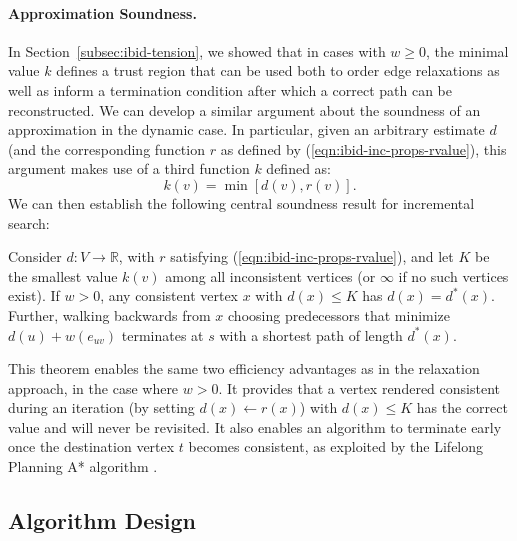\paragraph{Approximation Soundness.}
In Section~\ref{subsec:ibid-tension},
we showed that in cases with $w \geq 0$,
the minimal value $k$ defines a trust region that can be used both
to order edge relaxations as well as inform a termination condition
after which a correct path can be reconstructed.
We can develop a similar argument about the soundness of an
approximation in the dynamic case.
In particular,
given an arbitrary estimate $d$
(and the corresponding function $r$ as defined by
(\ref{eqn:ibid-inc-props-rvalue}),
this argument makes use of a third function $k$ defined as:
\begin{equation}
   k(v) = \min\left[ d(v), r(v) \right].
   \label{eqn:ibid:incremental-key}
\end{equation}
We can then establish the following central soundness result
for incremental search:

\begin{theorem}
Consider $d: V \rightarrow \mathbb{R}$,
with $r$ satisfying (\ref{eqn:ibid-inc-props-rvalue}),
and let $K$ be the smallest value $k(v)$
among all inconsistent vertices
(or $\infty$ if no such vertices exist).
If $w > 0$,
any consistent vertex $x$ with $d(x) \leq K$
has $d(x) = d^*(x)$.
Further,
walking backwards from $x$ choosing predecessors that minimize
$d(u) + w(e_{uv})$ terminates at $s$ with a shortest path
of length $d^*(x)$.
\label{thm:ibid-dynamicswsffp-sound}
\end{theorem}

This theorem enables the same two efficiency advantages as in
the relaxation approach, in the case where $w > 0$.
It provides that a vertex rendered consistent during an iteration
(by setting $d(x) \leftarrow r(x)$) with $d(x) \leq K$
has the correct value and will never be revisited.
It also enables an algorithm to terminate early
once the destination vertex $t$ becomes consistent,
as exploited by the Lifelong Planning A* algorithm
\citep{koenig2004lpastar}.

\subsection{Algorithm Design}

